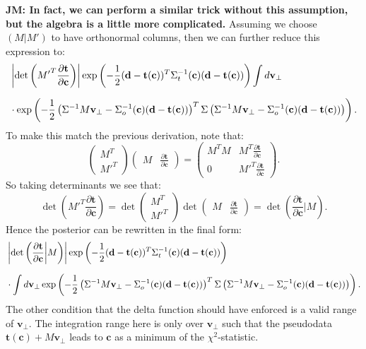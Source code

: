 \documentclass[withindex,glossary]{cam-thesis}
\renewcommand{\vec}[1]{\textbf{#1}} %
\newcommand{\JM}[1]{{\bf\color{cyan}JM: #1}}
\begin{document}
\JM{In fact, we can perform a similar trick without this assumption, but the algebra is a little more complicated.} Assuming we choose $(M | M')$ to have orthonormal columns, then we can further reduce this expression to:
\begin{align}
& \left| \det\left({M'}^T \frac{\partial \vec{t}}{\partial \vec{c}} \right) \right| \exp\left( -\frac{1}{2}(\vec{d} - \vec{t}(\vec{c}))^T\Sigma_t^{-1}(\vec{c}) (\vec{d} - \vec{t}(\vec{c})) \right) \int d\vec{v}_{\perp} \notag\\[1.5ex]
& \cdot \exp\left( -\frac{1}{2} \left(\Sigma^{-1} M \vec{v}_{\perp} - \Sigma_o^{-1}(\vec{c}) (\vec{d} - \vec{t}(\vec{c}))\right)^T \Sigma \left(\Sigma^{-1} M \vec{v}_{\perp} - \Sigma_o^{-1}(\vec{c}) (\vec{d} - \vec{t}(\vec{c}))\right) \right).
\end{align}
To make this match the previous derivation, note that:
\begin{equation}
\begin{pmatrix} M^T \\ {M'}^T \end{pmatrix} \begin{pmatrix} M & \frac{\partial \vec{t}}{\partial \vec{c}} \end{pmatrix} = \begin{pmatrix} M^TM & M^T \frac{\partial \vec{t}}{\partial \vec{c}} \\ 0 & {M'}^T \frac{\partial \vec{t}}{\partial \vec{c}} \end{pmatrix}.
\end{equation}
So taking determinants we see that:
\begin{equation}
\det\left( {M'}^T \frac{\partial \vec{t}}{\partial \vec{c}}\right) = \det\begin{pmatrix} M^T \\ {M'}^T \end{pmatrix}\det\begin{pmatrix} M & \frac{\partial \vec{t}}{\partial \vec{c}} \end{pmatrix} = \det\left( \frac{\partial \vec{t}}{\partial \vec{c}} \bigg| M \right).
\end{equation}
Hence the posterior can be rewritten in the final form:
\begin{align}
& \left|\det\left( \frac{\partial \vec{t}}{\partial \vec{c}} \bigg| M \right) \right| \exp\left( -\frac{1}{2}(\vec{d} - \vec{t}(\vec{c}))^T\Sigma_t^{-1}(\vec{c}) (\vec{d} - \vec{t}(\vec{c})) \right)  \notag\\[1.5ex]
& \cdot \int d\vec{v}_{\perp} \exp\left( -\frac{1}{2} \left(\Sigma^{-1} M \vec{v}_{\perp} - \Sigma_o^{-1}(\vec{c}) (\vec{d} - \vec{t}(\vec{c}))\right)^T \Sigma \left(\Sigma^{-1} M \vec{v}_{\perp} - \Sigma_o^{-1}(\vec{c}) (\vec{d} - \vec{t}(\vec{c}))\right) \right).
\end{align}
The other condition that the delta function should have enforced is a valid range of $\vec{v}_{\perp}$. The integration range here is only over $\vec{v}_{\perp}$ such that the pseudodata $\vec{t}(\vec{c}) + M\vec{v}_{\perp}$ leads to $\vec{c}$ as a minimum of the $\chi^2$-statistic.
\end{document}
